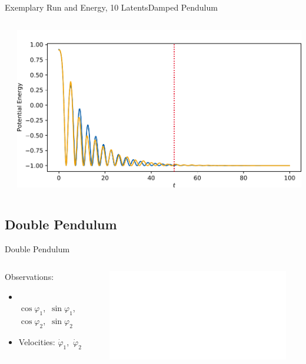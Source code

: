 \documentclass[
	aspectratio=43,
	color={accentcolor=1c},
	logo=false,
	colorframetitle=true,
	handout
]{tudabeamer}
\begin{document}
\begin{frame}[c]{Exemplary Run and Energy, 10 Latents}{Damped Pendulum}
\begin{columns}
\begin{column}{0.333\linewidth}
\begin{center}
						\end{center}
					\end{column}
					\begin{column}{0.333\linewidth}
						\begin{center}
							\includegraphics[width=\linewidth]{figures/experiments/pendulum-damped/energy-R110-N0-potential.pdf}
						\end{center}
					\end{column}
				\end{columns}
			\end{frame}

		\subsection{Double Pendulum}
			\begin{frame}{Double Pendulum}
				\begin{columns}[c]
					\begin{column}{0.35\linewidth}
						Observations:
						\begin{itemize}
							\item {} \\
								\quad \(\cos\varphi_1\),\, \(\sin\varphi_1\), \\
								\quad \(\cos\varphi_2\),\, \(\sin\varphi_2\)
							\item Velocities: \(\dot{\varphi}_1\),\, \(\dot{\varphi}_2\)
						\end{itemize}
						\begin{center}
							\resizebox{0.85\linewidth}{!}{\tikzDoublePendulum}
						\end{center}
					\end{column}
					\begin{column}{0.65\linewidth}
						\begin{center}
							\includegraphics<2->[width=\linewidth]{figures/experiments/acrobot-gym/log-likelihood.pdf}
						\end{center}
					\end{column}
				\end{columns}
			\end{frame}
\end{document}
